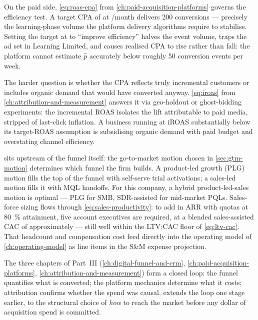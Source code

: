 On the paid side, \cref{eq:roas-cpa} from \cref{ch:paid-acquisition-platforms} governs
the efficiency test. A target CPA of  at /month delivers 200
conversions --- precisely the learning-phase volume the platform delivery algorithms require
to stabilise. Setting the target at  to ``improve efficiency'' halves the
event volume, traps the ad set in Learning Limited, and causes realised CPA to rise rather
than fall: the platform cannot estimate \(\hat{p}\) accurately below roughly 50 conversion
events per week.

The harder question is whether the  CPA reflects truly incremental customers or
includes organic demand that would have converted anyway. \cref{eq:iroas} from
\cref{ch:attribution-and-measurement} answers it via geo-holdout or ghost-bidding
experiments: the incremental ROAS isolates the lift attributable to paid media, stripped
of last-click inflation. A business running at iROAS substantially below its
target-ROAS assumption is subsidising organic demand with paid budget and overstating
channel efficiency.

 sits upstream of the funnel itself: the go-to-market motion
chosen in \cref{sec:gtm-motion} determines which funnel the firm builds. A product-led growth
(PLG) motion fills the top of the funnel with self-serve trial activations; a sales-led motion
fills it with MQL handoffs. For this company, a hybrid product-led-sales motion is optimal
--- PLG for SMB, SDR-assisted for mid-market PQLs. Sales-force sizing flows through
\cref{eq:sales-productivity}: to add  in ARR with  quotas at
\qty{80}{\percent} attainment, five account executives are required, at a blended
sales-assisted CAC of approximately  --- still well within the LTV:CAC floor of
\cref{eq:ltv-cac}. That headcount and compensation cost feed directly into the operating
model of \cref{ch:operating-model} as line items in the S\&M expense projection.

The three chapters of Part~III (\cref{ch:digital-funnel-and-crm}, \cref{ch:paid-acquisition-platforms},
\cref{ch:attribution-and-measurement}) form a closed loop: the funnel quantifies what is
converted; the platform mechanics determine what it costs; attribution confirms whether the
spend was causal.  extends the loop one stage earlier, to the
structural choice of \emph{how} to reach the market before any dollar of acquisition spend is
committed.

